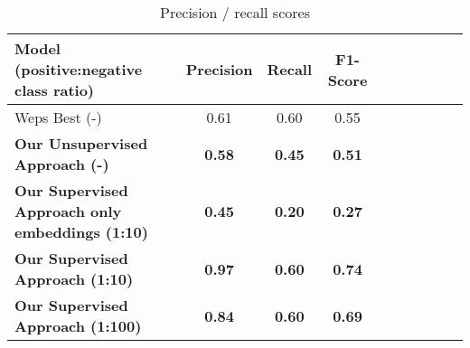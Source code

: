\begin{center}
\begin{table}[htb]
  \caption{Precision / recall scores}
  \begin{tabular}{l*{8}{c}r}
    \textbf {Model (positive:negative class ratio)} & \textbf{Precision} & \textbf{Recall} & \textbf{F1-Score} \\
    \hline
    Weps Best (-) \cite{weps3-eval} & 0.61 & 0.60 & 0.55 \\
    \textbf{Our Unsupervised Approach (-)} & \textbf{ 0.58 } & \textbf {0.45}  & \textbf{0.51} \\
    \textbf{Our Supervised Approach only embeddings (1:10)} & \textbf{ 0.45 } & \textbf{0.20} & \textbf{0.27} \\
    \textbf{Our Supervised Approach (1:10)} & \textbf { 0.97 } & \textbf {0.60} & \textbf{0.74} \\
    \textbf{Our Supervised Approach (1:100)} & \textbf{ 0.84 } & \textbf {0.60}  & \textbf{0.69} \\
  \end{tabular}
  \label{table:results}
\end{table}
\end{center}


